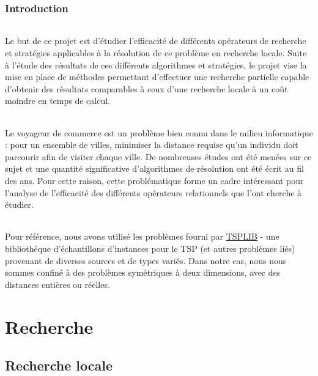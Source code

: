 \documentclass[a4paper,10pt]{report}
\begin{document}
\pagebreak
\section*{Introduction}

\paragraph{} %
  Le but de ce projet est d'étudier l'efficacité de différents opérateurs de recherche et stratégies applicables
à la résolution de ce problème en recherche locale. Suite à l'étude des résultats de ces différents algorithmes
et stratégies, le projet vise la mise en place de méthodes permettant d'effectuer une recherche partielle capable
d'obtenir des résultats comparables à ceux d'une recherche locale à un coût moindre en temps de calcul.

\paragraph{}
  Le voyageur de commerce est un problème bien connu dans le milieu informatique : pour un ensemble de villes,
minimiser la distance requise qu'un individu doit parcourir afin de visiter chaque ville. De nombreuses études
ont été menées sur ce sujet et une quantité significative d'algorithmes de résolution ont été écrit au fil des
ans. Pour cette raison, cette problématique forme un cadre intéressant pour l'analyse de l'efficacité des différents
opérateurs relationnels que l'ont cherche à étudier.

\paragraph{} %
  Pour référence, nous avons utilisé les problèmes fourni par
\href{https://www.iwr.uni-heidelberg.de/groups/comopt/software/TSPLIB95/}{TSPLIB}
- une bibliothèque d'échantillons d'instances pour le TSP (et autres problèmes liés) provenant de diverses sources
et de types variés. Dans notre cas, nous nous sommes confiné à des problèmes symétriques à deux dimensions, avec des
distances entières ou réelles.


\part{Recherche}
\chapter{Recherche locale}
\end{document}
